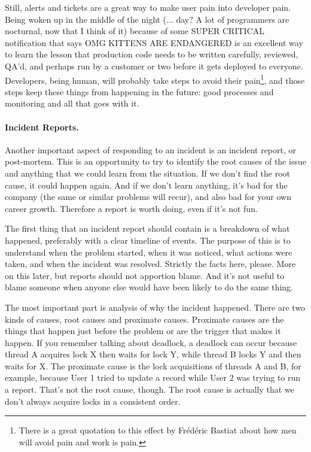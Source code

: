 Still, alerts and tickets are a great way to make user pain into developer pain. Being woken up in the middle of the night (... day? A lot of programmers are nocturnal, now that I think of it) because of some SUPER CRITICAL notification that says OMG KITTENS ARE ENDANGERED is an excellent way to learn the lesson that production code needs to be written carefully, reviewed, QA'd, and perhaps run by a customer or two before it gets deployed to everyone. Developers, being human, will probably take steps to avoid their pain\footnote{There is a great quotation to this effect by Fr\'ed\'eric Bastiat about how men will avoid pain and work is pain.}, and those steps keep these things from happening in the future: good processes and monitoring and all that goes with it.

\paragraph{Incident Reports.} 
Another important aspect of responding to an incident is an incident report, or post-mortem. This is an opportunity to try to identify the root causes of the issue and anything that we could learn from the situation. If we don't find the root cause, it could happen again. And if we don't learn anything, it's bad for the company (the same or similar problems will recur), and also bad for your own career growth. Therefore a report is worth doing, even if it's not fun.

The first thing that an incident report should contain is a breakdown of what happened, preferably with a clear timeline of events. The purpose of this is to understand when the problem started, when it was noticed, what actions were taken, and when the incident was resolved. Strictly the facts here, please. More on this later, but reports should not apportion blame. And it's not useful to blame someone when anyone else would have been likely to do the same thing.

The most important part is analysis of why the incident happened. There are two kinds of causes, root causes and proximate causes. Proximate causes are the things that happen just before the problem or are the trigger that makes it happen. If you remember talking about deadlock, a deadlock can occur because thread A acquires lock X then waits for lock Y, while thread B locks Y and then waits for X. The proximate cause is the lock acquisitions of threads A and B, for example, because User 1 tried to update a record while User 2 was trying to run a report. That's not the root cause, though. The root cause is actually that we don't always acquire locks in a consistent order.

